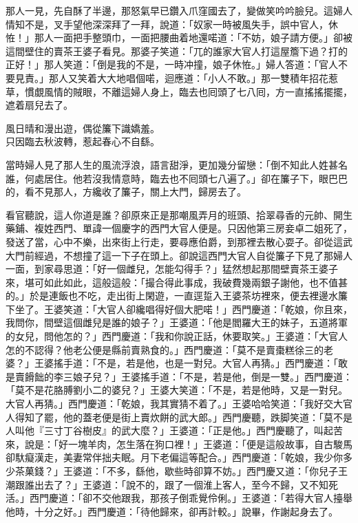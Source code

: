 那人一見，先自酥了半邊，那怒氣早已鑽入爪窪國去了，變做笑吟吟臉兒。這婦人情知不是，叉手望他深深拜了一拜，說道：「奴家一時被風失手，誤中官人，休恠！」那人一面把手整頭巾，一面把腰曲着地還喏道：「不妨，娘子請方便。」卻被這間壁住的賣茶王婆子看見。{}那婆子笑道：「兀的誰家大官人打這屋簷下過？打的正好！」那人笑道：「倒是我的不是，一時冲撞，娘子休恠。」婦人答道：「官人不要見責。」那人又笑着大大地唱個喏，迴應道：「小人不敢。」那一雙積年招花惹草，慣覷風情的賊眼，不離這婦人身上，{}臨去也囘頭了七八囘，方一直搖搖擺擺，遮着扇兒去了。

\begin{myquote}
風日晴和漫出遊，偶從簾下識嬌羞。\\只因臨去秋波轉，惹起春心不自繇。
\end{myquote}

當時婦人見了那人生的風流浮浪，語言甜淨，更加幾分留戀：「倒不知此人姓甚名誰，何處居住。他若沒我情意時，臨去也不囘頭七八遍了。」{}卻在簾子下，眼巴巴的，看不見那人，方纔收了簾子，關上大門，歸房去了。

看官聽說，這人你道是誰？卻原來正是那嘲風弄月的班頭、拾翠尋香的元帥、開生藥鋪、複姓西門、單諱一個慶字的西門大官人便是。只因他第三房妾卓二姐死了，發送了當，心中不樂，出來街上行走，要尋應伯爵，到那裡去散心耍子。卻從這武大門前經過，不想撞了這一下子在頭上。卻說這西門大官人自從簾子下見了那婦人一面，到家尋思道：「好一個雌兒，怎能勾得手？」猛然想起那間壁賣茶王婆子來，堪可如此如此，這般這般：「撮合得此事成，我破費幾兩銀子謝他，也不值甚的。」於是連飯也不吃，走出街上閑遊，一直逕踅入王婆茶坊裡來，便去裡邊水簾下坐了。王婆笑道：「大官人卻纔唱得好個大肥喏！」西門慶道：「乾娘，你且來，我問你，間壁這個雌兒是誰的娘子？」王婆道：「他是閻羅大王的妹子，五道將軍的女兒，{}問他怎的？」西門慶道：「我和你說正話，休要取笑。」王婆道：「大官人怎的不認得？他老公便是縣前賣熟食的。」{}西門慶道：「莫不是賣棗糕徐三的老婆？」王婆搖手道：「不是，若是他，也是一對兒。大官人再猜。」西門慶道：「敢是賣餶飿的李三娘子兒？」王婆搖手道：「不是，若是他，倒是一雙。」西門慶道：「莫不是花胳膊劉小二的婆兒？」王婆大笑道：「不是，若是他時，又是一對兒。大官人再猜。」西門慶道：「乾娘，我其實猜不着了。」王婆哈哈笑道：「我好交大官人得知了罷，他的蓋老便是街上賣炊餅的武大郎。」西門慶聽，跌脚笑道：「莫不是人叫他『三寸丁谷樹皮』的武大麼？」王婆道：「正是他。」西門慶聽了，叫起苦來，說是：「好一塊羊肉，怎生落在狗口裡！」王婆道：「便是這般故事，自古駿馬卻馱癡漢走，美妻常伴拙夫眠。月下老偏這等配合。」西門慶道：「乾娘，我少你多少茶菓錢？」{}王婆道：「不多，繇他，歇些時卻算不妨。」西門慶又道：「你兒子王潮跟誰出去了？」王婆道：「說不的，跟了一個淮上客人，至今不歸，又不知死活。」西門慶道：「卻不交他跟我，那孩子倒乖覺伶俐。」王婆道：「若得大官人擡舉他時，十分之好。」西門慶道：「待他歸來，卻再計較。」說畢，作謝起身去了。

